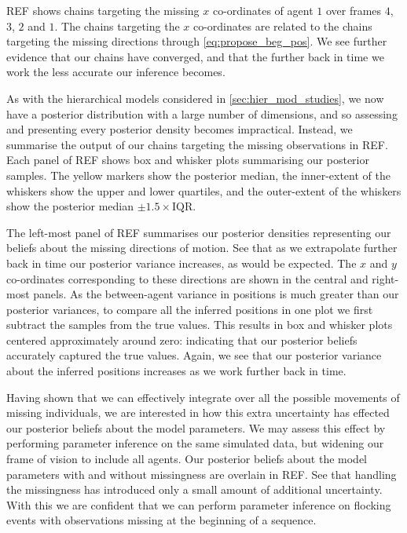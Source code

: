 REF shows chains targeting the missing $x$ co-ordinates of agent $1$ over frames 
$4$, $3$, $2$ and $1$. The chains targeting the $x$ co-ordinates are related to
the chains targeting the missing directions through \cref{eq:propose_beg_pos}.
We see further evidence that our chains have converged, and that the further
back in time we work the less accurate our inference becomes.

As with the hierarchical models considered in \cref{sec:hier_mod_studies}, we
now have a posterior distribution with a large number of dimensions, and so
assessing and presenting every posterior density becomes impractical. Instead,
we summarise the output of our chains targeting the missing observations in
REF. Each panel of REF shows box and whisker plots summarising our posterior
samples. The yellow markers show the posterior median, the inner-extent of the
whiskers show the upper and lower quartiles, and the outer-extent of the
whiskers show the posterior median $\pm1.5\times\text{IQR}$.

The left-most panel of REF summarises our posterior densities representing our
beliefs about the missing directions of motion. See that as we extrapolate
further back in time our posterior variance increases, as would be expected.
The $x$ and $y$ co-ordinates corresponding to these directions are shown in the
central and right-most panels. As the between-agent variance in positions is
much greater than our posterior variances, to compare all the inferred
positions in one plot we first subtract the samples from the true values. This
results in box and whisker plots centered approximately around zero:
indicating that our posterior beliefs accurately captured the true values.
Again, we see that our posterior variance about the inferred positions
increases as we work further back in time.

Having shown that we can effectively integrate over all the possible movements
of missing individuals, we are interested in how this extra uncertainty has
effected our posterior beliefs about the model parameters. We may assess this
effect by performing parameter inference on the same simulated data, but
widening our frame of vision to include all agents. Our posterior beliefs about
the model parameters with and without missingness are overlain in REF. See that
handling the missingness has introduced only a small amount of additional
uncertainty. With this we are confident that we can perform parameter inference
on flocking events with observations missing at the beginning of a sequence.

